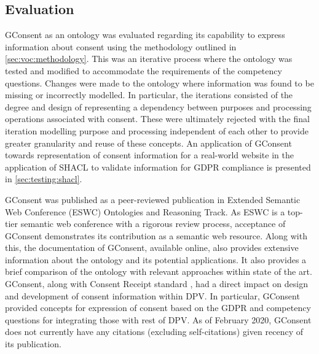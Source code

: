 \subsection{Evaluation}\label{sec:voc:gconsent:evaluation}
GConsent as an ontology was evaluated regarding its capability to express information about consent using the methodology outlined in \autoref{sec:voc:methodology}.
This was an iterative process where the ontology was tested and modified to accommodate the requirements of the competency questions. Changes were made to the ontology where information was found to be missing or incorrectly modelled.
In particular, the iterations consisted of the degree and design of representing a dependency between purposes and processing operations associated with consent. These were ultimately rejected with the final iteration modelling purpose and processing independent of each other to provide greater granularity and reuse of these concepts.
An application of GConsent towards representation of consent information for a real-world website in the application of SHACL to validate information for GDPR compliance is presented in \autoref{sec:testing:shacl}.

GConsent was published as a peer-reviewed publication \cite{pandit_gconsent_2019} in Extended Semantic Web Conference (ESWC) Ontologies and Reasoning Track. As ESWC is a top-tier semantic web conference with a rigorous review process, acceptance of GConsent demonstrates its contribution as a semantic web resource.
Along with this, the documentation of GConsent, available online, also provides extensive information about the ontology and its potential applications. It also provides a brief comparison of the ontology with relevant approaches within state of the art.
GConsent, along with Consent Receipt standard \cite{lizar_consent_2017}, had a direct impact on design and development of consent information within DPV. In particular, GConsent provided concepts for expression of consent based on the GDPR and competency questions for integrating those with rest of DPV.
As of February 2020, GConsent does not currently have any citations (excluding self-citations) given recency of its publication.

